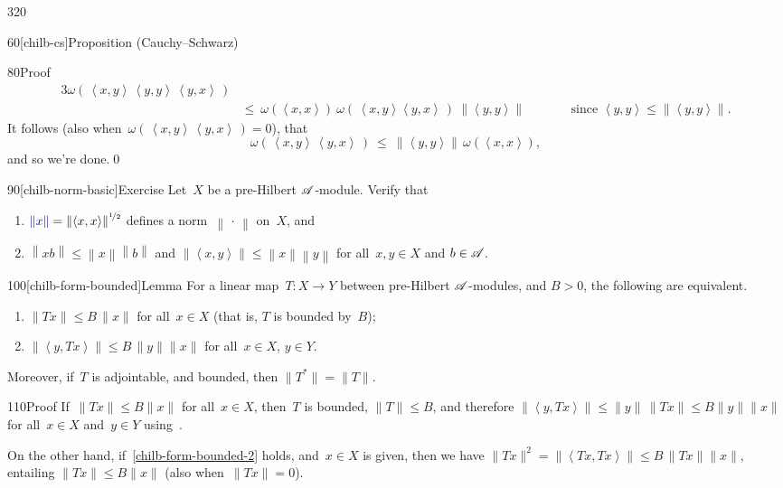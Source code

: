 \begin{parsec}{320}
\begin{point}{60}[chilb-cs]{Proposition (Cauchy--Schwarz)}
\begin{point}{80}{Proof}
\begin{alignat*}{3}
\omega(\,\left<x,y\right> \,\left<y,y\right>\, \left<y,x\right>\,)
\\
&\leq\ 
\omega(\left<x,x\right>)\ 
\omega(\,\left<x,y\right>\left<y,x\right>\,)
\  \left\|\left<y,y\right>\right\|
\qquad
&&\text{since $\left<y,y\right>\leq \left\|\left<y,y\right>\right\|$.}
\end{alignat*}
It follows
(also when~$\omega(\,\left<x,y\right>\,\left<y,x\right>\,)=0$),
that 
\begin{equation*}
\omega(\,\left<x,y\right>\,\left<y,x\right>\,)\ \leq\ 
\left\|\left<y,y\right>\right\|\,
\omega(\left<x,x\right>),
\end{equation*}
and so we're done.\qed
\end{point}
\end{point}
\begin{point}{90}[chilb-norm-basic]{Exercise}%
Let~$X$ be a pre-Hilbert $\mathscr{A}$-module.
Verify that
\begin{enumerate}
	\item
$\Define{\|x\|} = \left\|\left<x,x\right>\right\|^{\nicefrac{1}{2}}$
defines a norm~$\left\|\,\cdot\,\right\|$%
on~$X$, and
\item
$\left\|xb\right\|\leq \left\|x\right\|\left\|b\right\|$
and $\left\|\left<x,y\right>\right\|\leq \left\|x\right\|
\left\|y\right\|$
for all~$x,y\in X$ and $b\in \mathscr{A}$.
\end{enumerate}
\end{point}
\begin{point}{100}[chilb-form-bounded]{Lemma}%
For a linear map~$T\colon X\to Y$
between pre-Hilbert $\mathscr{A}$-modules,
and $B>0$,
the following are equivalent.
\begin{enumerate}
\item 
\label{chilb-form-bounded-1}
$\|Tx\|\leq B\,\|x\|$ for all~$x\in X$
(that is, $T$ is bounded by~$B$);
\item
\label{chilb-form-bounded-2}
$\left\|\left<y,Tx\right>\right\|\leq B\,\|y\|\|x\|$
for all~$x\in X$, $y\in Y$.
\end{enumerate}
Moreover,
if~$T$ is adjointable,
and bounded, then $\|T^*\|=\|T\|$.
\begin{point}{110}{Proof}%
If~$\|Tx\|\leq B\|x\|$ for all~$x\in X$,
then~$T$ is bounded, $\|T\|\leq B$, and therefore
$\left\|\left<y,Tx\right>\right\|
\leq \|y\|\,\|Tx\|\leq B \|y\|\|x\|$
for all~$x\in X$ and~$y\in Y$ using~.

On the other hand,
if~\ref{chilb-form-bounded-2} holds,
and~$x\in X$ is given,
then we have $\|Tx\|^2=\left\|\left<Tx,Tx\right>\right\|
\leq B \,\|Tx\|\|x\|$,
entailing $\|Tx\|\leq B\|x\|$
(also when~$\|Tx\|=0$).


\end{point}
\end{point}
\end{parsec}
